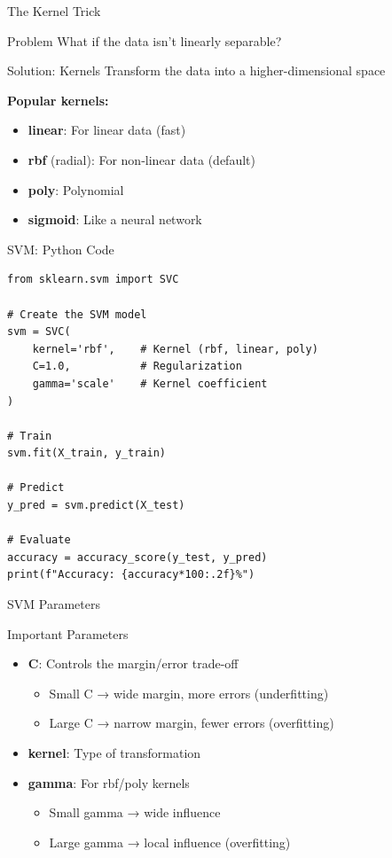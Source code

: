 \documentclass[aspectratio=169]{beamer}
\begin{document}
\begin{frame}{The Kernel Trick}
\begin{block}{Problem}
What if the data isn't linearly separable?
\end{block}

\vspace{0.3cm}
\begin{block}{Solution: Kernels}
Transform the data into a higher-dimensional space
\end{block}

\vspace{0.3cm}
\textbf{Popular kernels:}
\begin{itemize}
    \item \textbf{linear}: For linear data (fast)
    \item \textbf{rbf} (radial): For non-linear data (default)
    \item \textbf{poly}: Polynomial
    \item \textbf{sigmoid}: Like a neural network
\end{itemize}
\end{frame}

\begin{frame}[fragile]{SVM: Python Code}
\begin{lstlisting}
from sklearn.svm import SVC

# Create the SVM model
svm = SVC(
    kernel='rbf',    # Kernel (rbf, linear, poly)
    C=1.0,           # Regularization
    gamma='scale'    # Kernel coefficient
)

# Train
svm.fit(X_train, y_train)

# Predict
y_pred = svm.predict(X_test)

# Evaluate
accuracy = accuracy_score(y_test, y_pred)
print(f"Accuracy: {accuracy*100:.2f}%")
\end{lstlisting}
\end{frame}

\begin{frame}{SVM Parameters}
\begin{block}{Important Parameters}
\begin{itemize}
    \item \textbf{C}: Controls the margin/error trade-off
    \begin{itemize}
        \item Small C → wide margin, more errors (underfitting)
        \item Large C → narrow margin, fewer errors (overfitting)
    \end{itemize}
    
    \item \textbf{kernel}: Type of transformation
    
    \item \textbf{gamma}: For rbf/poly kernels
    \begin{itemize}
        \item Small gamma → wide influence
        \item Large gamma → local influence (overfitting)
    \end{itemize}
\end{itemize}
\end{block}
\end{frame}
\end{document}
